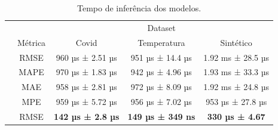 \begin{table}[!htp]
    \caption{Tempo de inferência dos modelos.}
    \label{tab:tempo_inferencia}
    \setlength\extrarowheight{5pt}
    \begin{tabular}{|c|c|ccc|}
        \hline
        \rowcolor[HTML]{C0C0C0}
        \cellcolor[HTML]{C0C0C0}                          & \cellcolor[HTML]{C0C0C0}                          & \multicolumn{3}{c|}{\cellcolor[HTML]{C0C0C0}Dataset}                                                                                                                         \\ \cline{3-5}
        \rowcolor[HTML]{C0C0C0}
        \multirow{-2}{*}{\cellcolor[HTML]{C0C0C0}Modelo}  & \multirow{-2}{*}{\cellcolor[HTML]{C0C0C0}Métrica} & \multicolumn{1}{c|}{\cellcolor[HTML]{C0C0C0}Covid}                      & \multicolumn{1}{c|}{\cellcolor[HTML]{C0C0C0}Temperatura}               & Sintético                 \\ \hline
        \cellcolor[HTML]{C0C0C0}                          & RMSE                                              & \multicolumn{1}{c|}{960 µs ± 2.51 µs}                                   & \multicolumn{1}{c|}{951 µs ± 14.4 µs}                                  & 1.92 ms ± 28.5 µs         \\ \cline{2-5}
        \rowcolor[HTML]{EFEFEF}
        \cellcolor[HTML]{C0C0C0}                          & MAPE                                              & \multicolumn{1}{c|}{\cellcolor[HTML]{EFEFEF}970 µs ± 1.83 µs}           & \multicolumn{1}{c|}{\cellcolor[HTML]{EFEFEF}942 µs ± 4.96 µs}          & 1.93 ms ± 33.3 µs         \\ \cline{2-5}
        \cellcolor[HTML]{C0C0C0}                          & MAE                                               & \multicolumn{1}{c|}{958 µs ± 2.81 µs}                                   & \multicolumn{1}{c|}{972 µs ± 8.09 µs}                                  & 1.92 ms ± 24.8 µs         \\ \cline{2-5}
        \rowcolor[HTML]{EFEFEF}
        \multirow{-4}{*}{\cellcolor[HTML]{C0C0C0}ARIMA}   & MPE                                               & \multicolumn{1}{c|}{\cellcolor[HTML]{EFEFEF}959 µs ± 5.72 µs}           & \multicolumn{1}{c|}{\cellcolor[HTML]{EFEFEF}956 µs ± 7.02 µs}          & 953 µs ± 27.8 µs          \\ \hline
        \cellcolor[HTML]{C0C0C0}                          & RMSE                                              & \multicolumn{1}{c|}{\textbf{142 µs ± 2.8 µs}}                           & \multicolumn{1}{c|}{\textbf{149 µs ± 349 ns}}                          & \textbf{330 µs ± 4.67}    \\ \cline{2-5}

\end{tabular}
\end{table}
